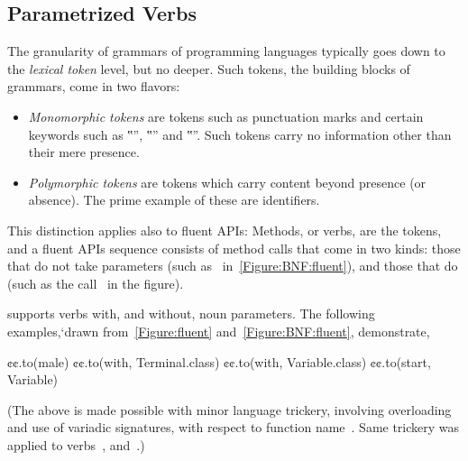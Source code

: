 \subsection{Parametrized Verbs}
The granularity of grammars of programming languages typically goes down to the \emph{lexical token} level,
  but no deeper.
Such tokens, the building blocks of grammars, come in two flavors:
\begin{itemize}
  \item \emph{Monomorphic tokens} are tokens such as punctuation marks and
    certain keywords such as ‟”, ‟” and ‟”.
    Such tokens carry no information other than their mere presence.
  \item \emph{Polymorphic tokens} are tokens which carry content beyond
    presence (or absence). The prime example of these are identifiers.
\end{itemize}

This distinction applies also to fluent APIs:
Methods, or verbs, are the tokens, and a fluent APIs sequence consists of
method calls that come in two kinds: those that do not take parameters (such as~ in~\cref{Figure:BNF:fluent}),
and those that do (such as the call~ in the figure).

\Self supports verbs with, and without, noun parameters.
The following examples,`drawn from~\cref{Figure:fluent} and~\cref{Figure:BNF:fluent},
  demonstrate,
\begin{JAVA}
  ¢¢.to(male)
  ¢¢.to(with, Terminal.class)
  ¢¢.to(with, Variable.class)
  ¢¢.to(start, Variable)\end{JAVA}
(The above is made possible with minor \Java language trickery,
  involving overloading and use of variadic signatures,
  with respect to function name~.
Same trickery was applied to verbs~, and~.)
